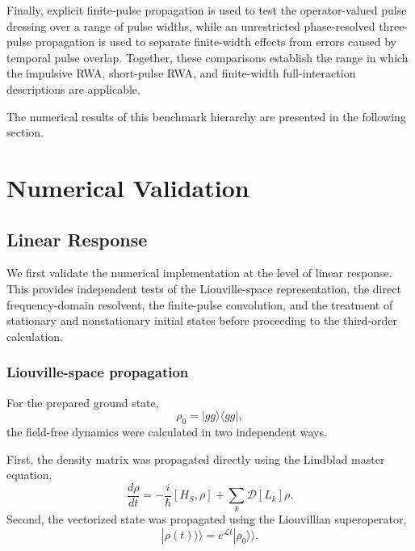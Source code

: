 \documentclass[11pt]{article}
\begin{document}
Finally, explicit finite-pulse propagation is used to test the
operator-valued pulse dressing over a range of pulse widths, while an
unrestricted phase-resolved three-pulse propagation is used to
separate finite-width effects from errors caused by temporal pulse
overlap. Together, these comparisons establish the range in which the
impulsive RWA, short-pulse RWA, and finite-width full-interaction
descriptions are applicable.

The numerical results of this benchmark hierarchy are presented in the
following section.
\section{Numerical Validation}
\label{sec:numerical_validation}

\subsection{Linear Response}
\label{sec:linear_validation}

We first validate the numerical implementation at the level of linear
response.  This provides independent tests of the Liouville-space
representation, the direct frequency-domain resolvent, the finite-pulse
convolution, and the treatment of stationary and nonstationary initial
states before proceeding to the third-order calculation.


\subsubsection{Liouville-space propagation}

For the prepared ground state,
%
\begin{equation}
\rho_0
=
|gg\rangle\langle gg|,
\end{equation}
%
the field-free dynamics were calculated in two independent ways.

First, the density matrix was propagated directly using the Lindblad
master equation,
%
\begin{equation}
\frac{d\rho}{dt}
=
-\frac{i}{\hbar}
[H_S,\rho]
+
\sum_k
\mathcal{D}[L_k]\rho.
\end{equation}
%
Second, the vectorized state was propagated using the Liouvillian
superoperator,
%
\begin{equation}
|\rho(t)\rangle\rangle
=
e^{\mathcal{L}t}
|\rho_0\rangle\rangle .
\end{equation}
\end{document}
